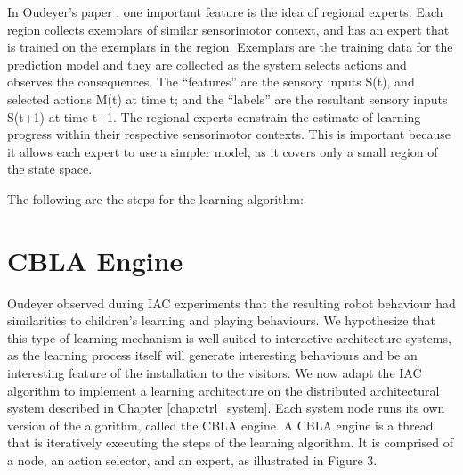 In Oudeyer's paper \cite{Oudeyer2007}, one important feature is the idea of regional experts. Each region collects exemplars of similar sensorimotor context, and has an expert that is trained on the exemplars in the region. Exemplars are the training data for the prediction model and they are collected as the system selects actions and observes the consequences. The “features” are the sensory inputs S(t), and selected actions M(t) at time t; and the “labels” are the resultant sensory inputs S(t+1) at time t+1. The regional experts constrain the estimate of learning progress within their respective sensorimotor contexts. This is important because it allows each expert to use a simpler model, as it covers only a small region of the state space.  

The following are the steps for the learning algorithm:


\section{CBLA Engine}

Oudeyer \cite{Oudeyer2005} observed during IAC experiments that the resulting robot behaviour had similarities to children's learning and playing behaviours.  We hypothesize that this type of learning mechanism is well suited to interactive architecture systems, as the learning process itself will generate interesting behaviours and be an interesting feature of the installation to the visitors. We now adapt the IAC algorithm \cite{Oudeyer2007} to implement a learning architecture on the distributed architectural system described in Chapter \ref{chap:ctrl_system}.  Each system node runs its own version of the algorithm, called the CBLA engine.  A CBLA engine is a thread that is iteratively executing the steps of the learning algorithm. It is comprised of a node, an action selector, and an expert, as illustrated in Figure 3. 


